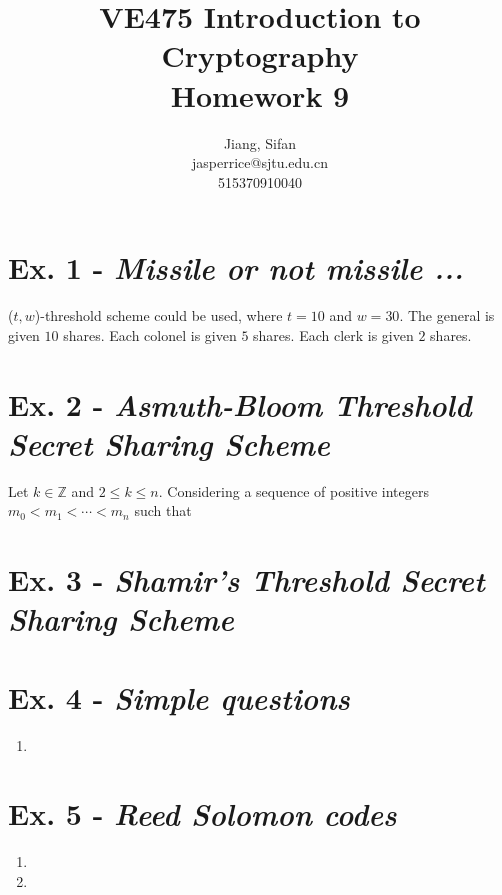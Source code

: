 \documentclass[11pt,a4paper]{article}
\title{
	VE475 Introduction to Cryptography \\
	Homework 9
}
\author{
	Jiang, Sifan\\
	jasperrice@sjtu.edu.cn\\
	515370910040
}
\begin{document}
\maketitle
\section*{Ex. 1 - \textit{Missile or not missile ...}}
\par ($t, w$)-threshold scheme could be used, where $t = 10$ and $w = 30$. The general is given $10$ shares. Each colonel is given $5$ shares. Each clerk is given $2$ shares.



\section*{Ex. 2 - \textit{Asmuth-Bloom Threshold Secret Sharing Scheme}}
\par Let $k \in \mathbb{Z}$ and $2 \leq k \leq n$. Considering a sequence of positive integers $m_{0} < m_{1} < \cdots < m_{n}$ such that $$



\section*{Ex. 3 - \textit{Shamir's Threshold Secret Sharing Scheme}}
\par 



\section*{Ex. 4 - \textit{Simple questions}}
	\begin{enumerate}
	\item 
	\end{enumerate}



\section*{Ex. 5 - \textit{Reed Solomon codes}}
	\begin{enumerate}
	\item
	
	\item 
	\end{enumerate}
\end{document}
